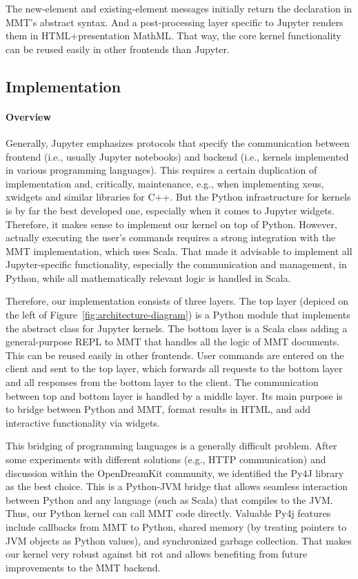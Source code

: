 The new-element and existing-element messages initially return the declaration in MMT's abstract syntax.
And a post-processing layer specific to Jupyter renders them in HTML+presentation MathML.
That way, the core kernel functionality can be reused easily in other frontends than Jupyter.

\subsection{Implementation}\label{sec:kernel:impl}

\paragraph{Overview}
Generally, Jupyter emphasizes protocols that specify the communication between frontend (i.e., usually Jupyter notebooks) and backend (i.e., kernels implemented in various programming languages).
This requires a certain duplication of implementation and, critically, maintenance, e.g., when implementing xeus, xwidgets and similar libraries for C++.
But the Python infrastructure for kernels is by far the best developed one, especially when it comes to Jupyter widgets. 
Therefore, it makes sense to implement our kernel on top of Python.
However, actually executing the user's commands requires a strong integration with the MMT implementation, which uses Scala.
That made it advisable to implement all Jupyter-specific functionality, especially the communication and management, in Python, while all mathematically relevant logic is handled in Scala.

Therefore, our implementation consists of three layers.
The top layer (depiced on the left of Figure~\ref{fig:architecture-diagram}) is a Python module that implements the abstract class for Jupyter kernels.
The bottom layer is a Scala class adding a general-purpose REPL to MMT that handles all the logic of MMT documents.
This can be reused easily in other frontends.
User commands are entered on the client and sent to the top layer, which forwards all requests to the bottom layer and all responses from the bottom layer to the client.
The communication between top and bottom layer is handled by a middle layer.
Its main purpose is to bridge between Python and MMT, format results in HTML, and add interactive functionality via widgets.

This bridging of programming languages is a generally difficult problem.
After some experiments with different solutions (e.g., HTTP communication) and discussion within the OpenDreamKit community, we identified the Py4J library~\cite{Py4J:on} as the best choice.
This is a Python-JVM bridge that allows seamless interaction between Python and any language (such as Scala) that compiles to the JVM.
Thus, our Python kernel can call MMT code directly.
Valuable Py4j features include callbacks from MMT to Python, shared memory (by treating pointers to JVM objects as Python values), and synchronized garbage collection.
That makes our kernel very robust against bit rot and allows benefiting from future improvements to the MMT backend.

